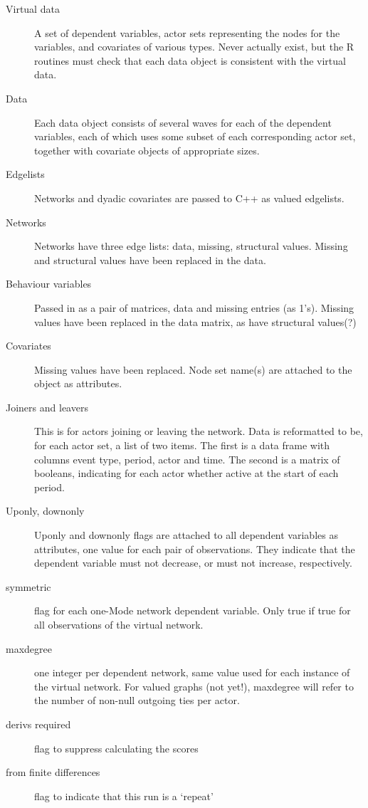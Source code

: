 \documentclass[12pt,a4paper]{article}
\renewcommand{\=}{\,=\,}
\newcommand{\+}{\,+\,}
\newcommand{\R}{{\sf R }}
\begin{document}
\begin{description}
\item [Virtual data] A set of dependent variables, actor sets representing the
  nodes for the variables, and covariates of various types. Never actually
  exist, but the \R routines must check that each data object is consistent with
  the virtual data.
\item[Data] Each data object consists of several waves for each of the dependent
  variables, each of which uses some subset of each corresponding actor set,
  together with covariate objects of appropriate sizes.
\item[Edgelists] Networks and dyadic covariates are passed to C++ as valued
  edgelists.
\item [Networks] Networks have three edge lists: data, missing, structural
  values. Missing and structural values have been replaced in the data.
\item[Behaviour variables] Passed in as a pair of matrices, data and missing
  entries (as 1's). Missing values have been replaced in the data matrix, as
  have structural values(?)
\item [Covariates] Missing values have been replaced. Node set name(s) are
  attached to the object as attributes.
\item[Joiners and leavers] This is for actors joining or leaving the network.
  Data is reformatted to be, for each actor set, a list
  of two items. The first is a data frame with columns event type, period, actor
  and time. The second is a matrix of booleans, indicating for each actor
  whether active at the start of each period.
\item[Uponly, downonly] Uponly and downonly flags are attached to all dependent
  variables as attributes, one value for each pair of observations.
  They indicate that the dependent variable must not decrease, or must not
  increase, respectively.
\item[symmetric] flag for each one-Mode network dependent variable. Only true if
  true for all observations of the virtual network.
\item[maxdegree] one integer per dependent network, same value used for each
  instance of the virtual network.  For valued graphs (not yet!), maxdegree will
  refer to the number of non-null outgoing ties per actor.
\item[derivs required] flag to suppress calculating the scores
\item[from finite differences] flag to indicate that this run is a `repeat'

\end{description}
\end{document}
